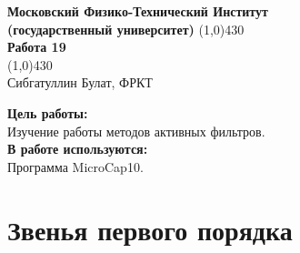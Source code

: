 \documentclass[a4paper, 12pt]{article}%
\begin{document}
\begin{titlepage}

\begin{center}
\large\textbf{Московский Физико-Технический Институт}\\
\large\textbf{(государственный университет)}
\vfill
\line(1,0){430}\\[1mm]
\huge\textbf{Работа 19}\\
\line(1,0){430}\\[1mm]
\vfill
\large Сибгатуллин Булат, ФРКТ\\
\end{center}

\end{titlepage}
\noindent \textbf{Цель работы:} \\
\indent Изучение работы методов активных фильтров.\\
\noindent \textbf{В работе используются:} \\
\indent Программа MicroCap10.

\section{Звенья первого порядка}
\end{document}
